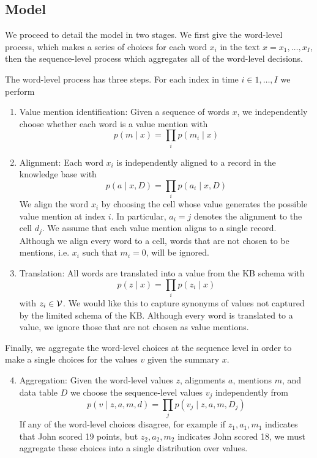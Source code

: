 \documentclass[12pt]{article}
\begin{document}
\subsection{Model}
We proceed to detail the model in two stages.
We first give the word-level process, which makes a series of choices
for each word $x_i$ in the text $x = x_1, \ldots, x_I$,
then the sequence-level process which aggregates all of the
word-level decisions.

The word-level process has three steps.
For each index in time $i \in 1, \ldots, I$ we perform
\begin{enumerate}
\item Value mention identification: Given a sequence of words $x$,
    we independently choose whether each word is a value mention with
    \begin{equation}
    p(m \mid x) = \prod_i p(m_i \mid x)
    \end{equation}
\item Alignment: Each word $x_i$ is independently aligned to a 
    record in the knowledge base with
    \begin{equation}
    p(a \mid x,D) = \prod_i p(a_i \mid x,D)
    \end{equation}
    We align the word $x_i$ by choosing the cell whose value
    generates the possible value mention at index $i$.
    In particular, $a_i = j$ denotes the alignment to the cell $d_{j}$.
    We assume that each value mention aligns to a single record.
    Although we align every word to a cell, words that are not
    chosen to be mentions, i.e. $x_i$ such that $m_i = 0$,
    will be ignored.
    \item Translation: All words are translated
    into a value from the KB schema with
    \begin{equation}
    p(z \mid x) = \prod_i p(z_i \mid x)
    \end{equation}
    with $z_i \in \mathcal{V}$.
    We would like this to capture synonyms of 
    values not captured by the limited schema of the KB.
    Although every word is translated to a value, we ignore
    those that are not chosen as value mentions.
\end{enumerate}

Finally, we aggregate the word-level choices at the sequence level in order
to make a single choices for the values $v$ given the summary $x$.
\begin{enumerate}
\setcounter{enumi}{3}
\item Aggregation:
    Given the word-level values $z$, alignments $a$, mentions $m$,
    and data table $D$ we choose the sequence-level values $v_j$ independently from
    \begin{equation}
    p(v \mid z,a,m,d) = \prod_j p(v_j \mid z,a,m,D_j)
    \end{equation}
    If any of the word-level choices disagree, for example if 
    $z_1,a_1,m_1$ indicates that John scored 19 points,
    but $z_2,a_2,m_2$ indicates John scored 18, 
    we must aggregate these choices into a single distribution over values.
\end{enumerate}
\end{document}

